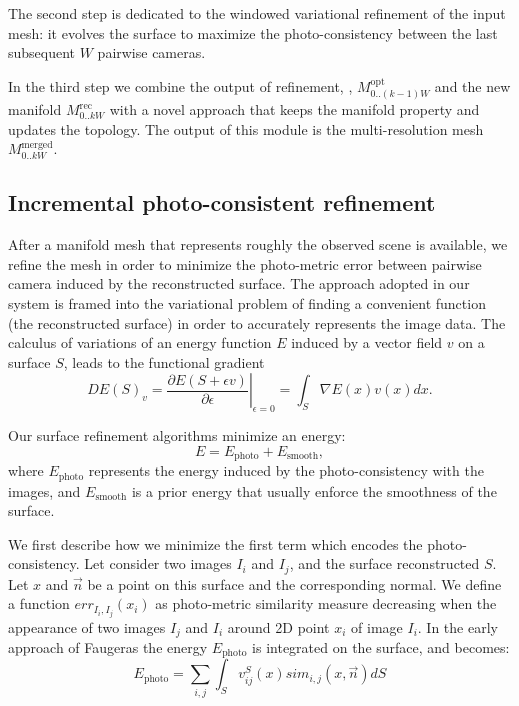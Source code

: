 The second step is dedicated to the windowed variational refinement of the input mesh: it evolves the surface to maximize the photo-consistency between the last subsequent $W$ pairwise cameras. 

In the third step we combine the output of refinement, \ie,   $\mathit{M}_{0..(k-1)W}^{\text{opt}}$  and the new manifold $\mathit{M}_{0..kW}^{\text{rec}}$ with a novel approach that keeps the manifold property and updates the topology. 
The output of this module is the multi-resolution mesh $\mathit{M}_{0..kW}^{\text{merged}}$.


\subsection{Incremental photo-consistent refinement}
\label{sec:Incremental_photoconsistent}
After a manifold mesh that represents roughly the observed scene is available, we refine the mesh in order to minimize the photo-metric error between pairwise camera induced by the reconstructed surface. 
The approach adopted in our system is framed into the variational problem of finding a convenient function (the reconstructed surface) in order to  accurately represents the image data.
The calculus of variations of an energy function $E$ induced by a vector field $v$ on a surface $\mathit{S}$, leads to the functional gradient
\begin{equation}
\label{eq::calculus}
 DE(\mathit{S})_v = \left.\frac{\partial E(\mathit{S} + \epsilon v)}{\partial \epsilon} \right|_{\epsilon=0} = \int_{\mathit{S}} \nabla E(x)v(x) dx.
\end{equation}

Our surface refinement algorithms minimize an energy:
\begin{equation}
E = E_{\textrm{photo}} + E_{\textrm{smooth}} ,
\end{equation}
where  $E_{\textrm{photo}}$ represents the energy induced by  the photo-consistency with the images, and $E_{\textrm{smooth}}$ is a prior energy that usually enforce the smoothness of the surface.  


We first describe how we minimize the first term which encodes the photo-consistency.
Let consider two images $I_i$ and $I_j$, and the surface reconstructed $\mathit{S}$. Let $x$ and $\overrightarrow{n}$ be a point on this surface and the corresponding normal. We define a function $err_{I_i, I_j}(x_i)$ as photo-metric similarity measure decreasing when the appearance of two images $I_j$ and $I_i$ around 2D point $x_i$ of image $I_i$.
In the early approach of Faugeras \etal \cite{faugeras2002variational} the energy $E_{\textrm{photo}}$ is integrated on the surface, and becomes:
\begin{equation}
 E_{\textrm{photo}} = \sum_{i,j}\int_{\mathit{S}} v^{\mathit{S}}_{ij}(x) sim_{i,j}(x, \overrightarrow{n}) d\mathit{S}
\end{equation}


